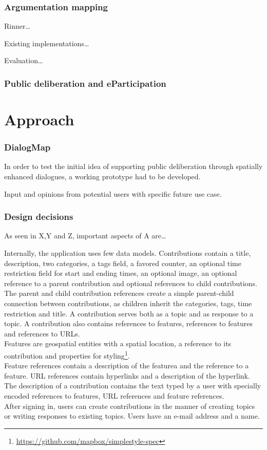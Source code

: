\documentclass{sigchi}
\begin{document}
\subsubsection{Argumentation mapping}
Rinner\cite{Rinner_ArgumentationMaps}\dots

Existing implementations\dots

Evaluation\dots
\subsubsection{Public deliberation and eParticipation}


\section{Approach}

\subsubsection{DialogMap}

In order to test the initial idea of supporting public deliberation through spatially enhanced dialogues, a working prototype had to be developed. 

Input and opinions from potential users with specific future use case.




\subsubsection{Design decisions} %

As seen in X,Y and Z, important aspects of A are\dots

Internally, the application uses few data models. Contributions contain a title, description, two categories, a tags field, a favored counter, an optional time restriction field for start and ending times, an optional image, an optional reference to a parent contribution and optional references to child contributions. The parent and child contribution references create a simple parent-child connection between contributions, as children inherit the categories, tags, time restriction and title. A contribution serves both as a topic and as response to a topic. A contribution also contains references to features, references to features and references to URLs.\\
Features are geospatial entities with a spatial location, a reference to its contribution and properties for styling\footnote{\url{https://github.com/mapbox/simplestyle-spec}}.\\
Feature references contain a description of the featurea and the reference to a feature. URL references contain hyperlinks and a description of the hyperlink. The description of a contribution contains the text typed by a user with specially encoded references to features, URL references and feature references.\\
After signing in, users can create contributions in the manner of creating topics or writing responses to existing topics. Users have an e-mail address and a name.
\end{document}
